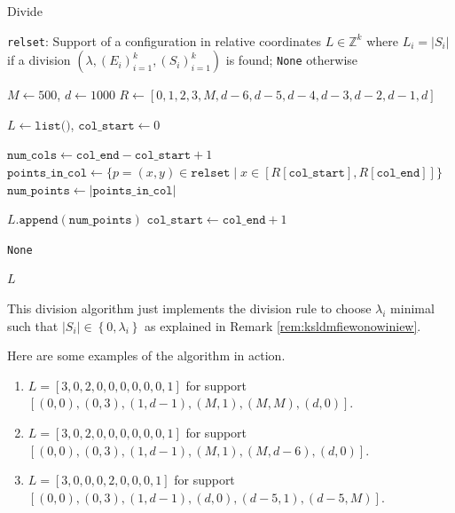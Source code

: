 \begin{algorithm}[H]
\caption{Divide}
\label{alg:divide}
\begin{algorithmic}[1]
\Require \texttt{relset}: Support of a configuration in relative coordinates
\Ensure \( L \in \mathbb{Z}^{k} \) where \( L_i = \lvert S_i \rvert \) if a division \( (\lambda, (E_i)_{i=1}^k, (S_i)_{i=1}^k) \) is found; \texttt{None} otherwise

\State $M \gets 500$, $d \gets 1000$
\State $R \gets [0, 1, 2, 3, M, d-6, d-5, d-4, d-3, d-2, d-1, d]$ 

\State $L \gets \texttt{list()}$, $\texttt{col\_start} \gets 0$

    \State $\texttt{num\_cols} \gets \texttt{col\_end} - \texttt{col\_start} + 1$
    \State $\texttt{points\_in\_col} \gets \{p = (x,y) \in \texttt{relset} \mid x \in [R[\texttt{col\_start}], R[\texttt{col\_end}]]\}$
    \State $\texttt{num\_points} \gets |\texttt{points\_in\_col}|$

        \State $L.\texttt{append}(\texttt{num\_points})$
        \State $\texttt{col\_start} \gets \texttt{col\_end} + 1$
    \EndIf
\EndFor

    \State \Return \texttt{None}
\EndIf

\State \Return $L$
\end{algorithmic}
\end{algorithm}

This division algorithm just implements the division rule to choose \( \lambda_i  \) minimal such that \( \lvert S_i \rvert \in \left\{ 0, \lambda_i \right\} \) as explained in Remark \ref{rem:ksldmfiewonowiniew}.

\begin{example}
    Here are some examples of the algorithm in action.
    \begin{enumerate}
        \item \( L=[3, 0, 2, 0, 0, 0, 0, 0, 0, 1]  \) for support \( [(0, 0), (0, 3), (1, d-1), (M, 1), (M, M), (d, 0)] \).
        \item \( L=[3, 0, 2, 0, 0, 0, 0, 0, 0, 1]  \) for support \( [(0, 0), (0, 3), (1, d-1), (M, 1), (M, d-6), (d, 0)] \).
        \item \( L=[3, 0, 0, 0, 2, 0, 0, 0, 1]  \) for support \( [(0, 0), (0, 3), (1, d-1), (d, 0), (d-5, 1), (d-5, M)] \).
    \end{enumerate}
\end{example}

